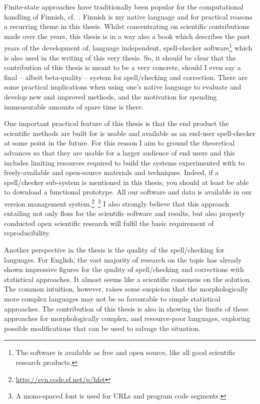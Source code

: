 \documentclass[officiallayout,final]{unihelcompling}
\begin{document}
Finite-state approaches have traditionally been popular for the computational
handling of Finnish, cf.~\citet{koskenniemi1983twolevel}. Finnish is my native
language and for practical reasons a recurring theme in this thesis. Whilst
concentrating on scientific contributions made over the years, this thesis is
in a way also a book which describes the past years of the development of,
language independent, \gls{spell-checker} software\footnote{The software is
    available as free and open source, like all good scientific research
products.} which is also used in the writing of this very thesis. So, it should
be clear that the contribution of this thesis is meant to be a very concrete,
should I even say a final -- albeit beta-quality -- system for spell\-/checking
and correction.  There are some practical implications when using one's native
language to evaluate and develop new and improved methods, and the motivation
for spending immeasurable amounts of spare time is there.

One important practical feature of this thesis is that the end product the
scientific methods are built for is usable and available as an end-user
spell-checker at some point in the future. For this reason I aim to ground the
theoretical advances so that they are usable for a larger audience of end users
and this includes limiting resources required to build the systems experimented
with to freely-available and open-source materials and techniques.  Indeed, if
a spell\-/checker sub-system is mentioned in this thesis, you should at least
be able to download a functional prototype.  All our software and data is
available in our version management
system.\footnote{\url{http://svn.code.sf.net/p/hfst}}~\footnote{A mono-spaced
font is used for URLs and program code segments.} I also strongly believe that
this approach entailing not only \gls{floss} for the scientific software and
results, but also properly conducted open scientific research will fulfil the
basic requirement of reproducibility.

Another perspective in the thesis is the quality of the spell\-/checking for
 languages. For
English, the vast majority of research on the topic has already shown
impressive figures for the quality of spell\-/checking and corrections with
statistical approaches. It almost seems like a scientific consensus on the
solution. The common intuition, however, raises some suspicion that the
morphologically more complex languages may not be so favourable to simple
statistical approaches. The contribution of this thesis is also in showing the
limits of these approaches for morphologically complex, and resource-poor
languages, exploring possible modifications that can be used to salvage the
situation.
\end{document}
